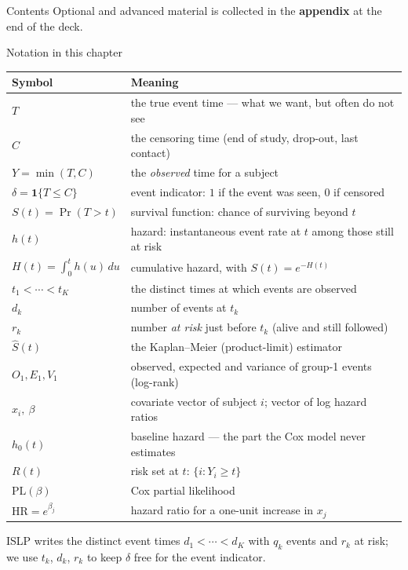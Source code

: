 \documentclass[aspectratio=169,11pt]{beamer}
\begin{document}
\begin{frame}{Contents}\small\tableofcontents[hideallsubsections]
  \vfill
  {\tiny Optional and advanced material is collected in the \textbf{appendix} at the end of the deck.}
\end{frame}

\begin{frame}{Notation in this chapter}
  \scriptsize
  \begin{center}
  \begin{tabular}{@{}ll@{}}
    \toprule
    \textbf{Symbol} & \textbf{Meaning} \\
    \midrule
    $T$ & the true event time --- what we want, but often do not see \\
    $C$ & the censoring time (end of study, drop-out, last contact) \\
    $Y=\min(T,C)$ & the \emph{observed} time for a subject \\
    $\delta=\mathbf{1}\{T\le C\}$ & event indicator: $1$ if the event was seen, $0$ if censored \\
    $S(t)=\Pr(T>t)$ & survival function: chance of surviving beyond $t$ \\
    $h(t)$ & hazard: instantaneous event rate at $t$ among those still at risk \\
    $H(t)=\int_0^t h(u)\,du$ & cumulative hazard, with $S(t)=e^{-H(t)}$ \\
    $t_1<\cdots<t_K$ & the distinct times at which events are observed \\
    $d_k$ & number of events at $t_k$ \\
    $r_k$ & number \emph{at risk} just before $t_k$ (alive and still followed) \\
    $\hat S(t)$ & the Kaplan--Meier (product-limit) estimator \\
    $O_1,E_1,V_1$ & observed, expected and variance of group-1 events (log-rank) \\
    $x_i,\ \beta$ & covariate vector of subject $i$; vector of log hazard ratios \\
    $h_0(t)$ & baseline hazard --- the part the Cox model never estimates \\
    $R(t)$ & risk set at $t$: $\{i : Y_i\ge t\}$ \\
    $\mathrm{PL}(\beta)$ & Cox partial likelihood \\
    $\mathrm{HR}=e^{\beta_j}$ & hazard ratio for a one-unit increase in $x_j$ \\
    \bottomrule
  \end{tabular}
  \end{center}
  {\tiny ISLP writes the distinct event times $d_1<\cdots<d_K$ with $q_k$ events and $r_k$ at risk; we use $t_k$, $d_k$, $r_k$ to keep $\delta$ free for the event indicator.}
\end{frame}
\end{document}
